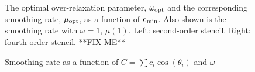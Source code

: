 \documentclass{article}
\begin{document}
{
\renewcommand{\figWidth}{7.cm}
\newcommand{\trimfig}[2]{\trimhb{#1}{#2}{.0}{.0}{.0}{.0}}
\begin{figure}[hbt]
\begin{center}
\end{center}
\caption{The optimal over-relaxation parameter, $\omega_{\rm opt}$ and the corresponding smoothing
   rate, $\mu_{\rm opt}$, as a function of ${\rm c}_{\rm min}$. Also shown is the smoothing rate
with $\omega=1$, $\mu(1)$. Left: second-order stencil.
Right: fourth-order stencil. **FIX ME**}
\label{fig:redBlack}
\end{figure}
}




{
\renewcommand{\figWidth}{7.cm}
\newcommand{\trimfig}[2]{\trimhb{#1}{#2}{.0}{.0}{.0}{.0}}
\begin{figure}[hbt]
\begin{center}
\end{center}
\caption{Smoothing rate as a function of $C=\sum c_i \cos(\theta_i)$ and $\omega$}
\label{fig:redBlackSurf}
\end{figure}
}
\end{document}

